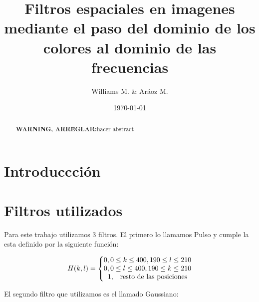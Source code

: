\documentclass[11pt,a4paper]{emulateapj}
\def \warn {{\sffamily\bfseries\large WARNING, ARREGLAR:}}
\begin{document}
\title{Filtros espaciales en imagenes mediante el paso del dominio de los colores al dominio de las frecuencias}
\author{Williams M. \& Aráoz M.}
\date{\today}


\begin{abstract}
\warn{hacer abstract}
\end{abstract}

\maketitle




\section{Introduccción}
\label{sec:introduccion}



\section{Filtros utilizados}
\label{sec:sec2}
Para este trabajo utilizamos 3 filtros. El primero lo llamamos Pulso y cumple la esta definido por la siguiente función:

\begin{eqnarray}
H(k,l) = \left\{
	\begin{matrix}
		0, 0 \leq k \leq 400, 190 \leq l \leq 210 \\
		0, 0 \leq l \leq 400, 190 \leq k \leq 210 \\
		1, \quad $resto de las posiciones$
	\end{matrix} 
	\right.
\end{eqnarray}

El segundo filtro que utilizamos es el llamado Gaussiano:
\end{document}
